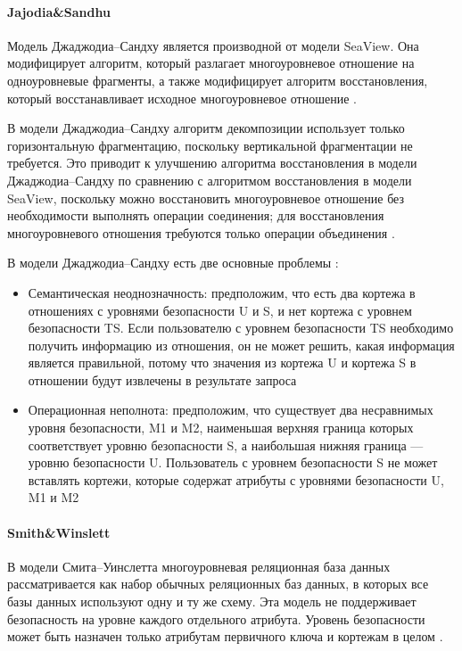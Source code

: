 \paragraph{Jajodia\&Sandhu}

Модель Джаджодиа–Сандху является производной от модели SeaView. Она модифицирует алгоритм, который разлагает
многоуровневое отношение на одноуровневые фрагменты, а также модифицирует алгоритм восстановления, который
восстанавливает исходное многоуровневое отношение \autocite{Osama}.

В модели Джаджодиа–Сандху алгоритм декомпозиции использует только горизонтальную фрагментацию, поскольку
вертикальной фрагментации не требуется. Это приводит к улучшению алгоритма восстановления в модели Джаджодиа–Сандху
по сравнению с алгоритмом восстановления в модели SeaView, поскольку можно восстановить многоуровневое отношение
без необходимости выполнять операции соединения; для восстановления многоуровневого отношения требуются только
операции объединения \autocite{Osama}.

В модели Джаджодиа–Сандху есть две основные проблемы \autocite{Osama}:
\begin{itemize}
    \item Семантическая неоднозначность: предположим, что есть два кортежа в отношениях с уровнями безопасности
    U и S, и нет кортежа с уровнем безопасности TS. Если пользователю с уровнем безопасности TS необходимо
    получить информацию из отношения, он не может решить, какая информация является правильной, потому что
    значения из кортежа U и кортежа S в отношении будут извлечены в результате запроса
    \item Операционная неполнота: предположим, что существует два несравнимых уровня безопасности, M1 и M2,
    наименьшая верхняя граница которых соответствует уровню безопасности S, а наибольшая нижняя граница ---
    уровню безопасности U. Пользователь с уровнем безопасности S не может вставлять кортежи, которые содержат
    атрибуты с уровнями безопасности U, M1 и M2
\end{itemize}

\paragraph{Smith\&Winslett}

В модели Смита–Уинслетта многоуровневая реляционная база данных рассматривается как набор обычных реляционных
баз данных, в которых все базы данных используют одну и ту же схему. Эта модель не поддерживает безопасность
на уровне каждого отдельного атрибута. Уровень безопасности может быть назначен только атрибутам первичного
ключа и кортежам в целом \autocite{Osama}.

